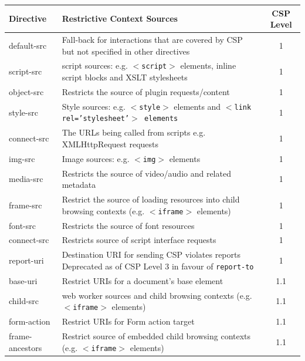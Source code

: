 \documentclass{mscreport}
\begin{document}
\clearpage
\newpage


\begin{table}
  \begin{center}
    \begin{tabular}{|l|J|c|}  %
      \hline
      \textbf{Directive} & \textbf{Restrictive Context Sources} & \textbf{CSP Level}\\
      \hline
      default-src & Fall-back for interactions that are covered by CSP but not specified in other directives & 1\\
      \hline
      script-src & script sources: e.g. \texttt{$<$script$>$} elements, inline script blocks and XSLT stylesheets & 1 \\
      \hline
      object-src & Restricts the source of plugin requests/content & 1 \\
      \hline
      style-src & Style sources: e.g. \texttt{$<$style$>$} elements and \texttt{$<$link rel='stylesheet'$>$ elements} & 1\\
      \hline
      connect-src & The URLs being called from scripts e.g. XMLHttpRequest requests & 1 \\
      \hline
      img-src & Image sources: e.g. \texttt{$<$img$>$} elements & 1\\
      \hline
      media-src & Restricts the source of video/audio and related metadata & 1\\
      \hline
      frame-src & Restrict the source of loading resources into child browsing contexts (e.g. \texttt{$<$iframe$>$} elements) & 1\\
      \hline
      font-src & Restricts the source of font resources & 1\\
      \hline
      connect-src & Restricts source of script interface requests & 1\\
      \hline
      report-uri & Destination URI for sending CSP violates reports Deprecated as of CSP Level 3 in favour of \texttt{report-to} & 1\\
      \hline
      base-uri & Restrict URIs for a document's base element & 1.1\\
      \hline
      child-src & web worker sources and child browsing contexts (e.g. \texttt{$<$iframe$>$} elements) & 1.1\\
      \hline
      form-action & Restrict URIs for Form action target & 1.1\\
      \hline
      frame-ancestors & Restrict source of embedded child browsing contexts (e.g. \texttt{$<$iframe$>$} elements) & 1.1\\

\end{tabular}
\end{center}
\end{table}
\end{document}
